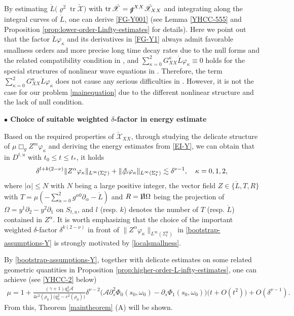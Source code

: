 \documentclass[11pt,twoside]{article}
\def\al{\alpha}
\def\vp{\varphi}
\def\p{\partial}
\def\dps{\displaystyle}
\begin{document}
By estimating $\mathring{L}\bigl(\varrho^2\operatorname{tr}\check{\mathscr X}\bigr)$ with
$\operatorname{tr}\check{\mathscr X}=\slashed g^{XX}\check{\mathscr{X}}_{XX}$ and integrating along the integral curves
of $\mathring{L}$, one can derive \eqref{FG-Y001} (see Lemma \ref{YHCC-555} and Proposition \ref{prop:lower-order-Linfty-estimates}
for details). Here we point out that the factor $\mathring{L}\vp_\kappa$ and its derivatives
in \eqref{FG-Y1} always admit favorable smallness orders and more precise long time decay rates
due to the null forms and the related compatibility condition in \cite{Ding2, Ding4}, and $\dps\sum_{\kappa=0}^2G_{XX}^\kappa\mathring{L}\vp_\kappa\equiv0$
holds for the special structures of nonlinear wave equations in \cite{M-Y, L-Y}.
Therefore, the term $\dps\sum_{\kappa=0}^2G_{XX}^\kappa\mathring{L}\vp_\kappa$
does not cause any serious difficulties in  \cite{Ding2, Ding4, M-Y, L-Y}. However, it is not the case
for our problem \eqref{mainequation} due to the different nonlinear structure and the lack of null condition.

\medskip
\textbf{$\bullet$ Choice of suitable weighted $\delta$-factor in energy estimate}
\medskip

Based on the required properties of $\check{\mathscr{X}}_{XX}$, through studying the delicate
structure of $\mu\Box_gZ^{m}\varphi_\kappa$ and deriving the energy estimates from \eqref{EI-Y},
we can obtain that in $D^{t,u}$ with $t_0\leq t \leq t_*$, it holds
\begin{equation}\label{bootstrap-assumptions-Y}
\delta^{l+k(2-\nu)} \| Z^{\alpha}\vp_{\kappa} \|_{L^{\infty}(\Sigma_t^u)}+\|\slashed\triangle\vp_{\kappa}\|_{L^{\infty}(\Sigma_t^u)}
\lesssim \delta^{\nu-1},
\quad \kappa= 0, 1, 2,
\end{equation}
where $|\alpha| \leq N$ with $N$ being a large positive integer, the vector field
$Z \in \{\mathring{L}, T, R\}$ with $T=\mu(-\dps\sum_{\alpha=0}^2g^{\al 0}\p_\al-\mathring L)$ and
$R=\slashed\Pi\Omega$ being the projection of $\Omega=y^1\p_2-y^2\p_1$ on $S_{t, u}$, and $l$ (resp. $k$) denotes the number of $T$ (resp. $\mathring{L}$)
contained in $Z^{\alpha}$. It is worth emphasizing that the choice of the important weighted $\delta$-factor
$\delta^{k(2-\nu)}$ in front of
$\|Z^{\alpha}\vp_{\kappa} \|_{L^{\infty}(\Sigma_t^u)}$ in \eqref{bootstrap-assumptions-Y} is strongly motivated by
\eqref{localsmallness}.



By \eqref{bootstrap-assumptions-Y}{,} together with delicate estimates on some related geometric quantities in Proposition \ref{prop:higher-order-L-infty-estimates}, one can achieve (see \eqref{YHCC-2} below)
\begin{equation*}
\begin{split}
\mu=1 + \frac{(\gamma+1) q_0^3\mathcal A}{4c^2(\rho_0)\bigl(q_0^2 - c^2(\rho_0)\bigr)} \delta^{\nu-2} \bigl(\mathcal A\p_s^2\Phi_0(s_0,\omega_0)-\p_s\Phi_1(s_0, \omega_0)\bigr)
\bigl(t + O(t^2)\bigr) + O(\delta^{\nu-1}).
\end{split}
\end{equation*}
From this, Theorem \ref{maintheorem} (A) will be shown.
\end{document}
